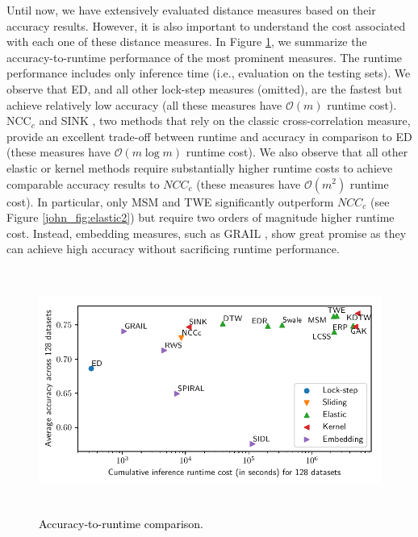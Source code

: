 \documentclass[11pt]{article}
\begin{document}
Until now, we have extensively evaluated distance measures based on their accuracy results. However, it is also important to understand the cost associated with each one of these distance measures. In Figure \ref{john_fig:accuracyruntime}, we summarize the accuracy-to-runtime performance of the most prominent measures. The runtime performance includes only inference time (i.e., evaluation on the testing sets). We observe that ED, and all other lock-step measures (omitted), are the fastest but achieve relatively low accuracy (all these measures have $\mathcal{O}(m)$ runtime cost). NCC$_c$ \cite{paparrizos2015k} and SINK \cite{paparrizos2019grail}, two methods that rely on the classic cross-correlation measure, provide an excellent trade-off between runtime and accuracy in comparison to ED (these measures have $\mathcal{O}(m \log m)$ runtime cost). We also observe that all other elastic or kernel methods require substantially higher runtime costs to achieve comparable accuracy results to $NCC_c$ (these measures have $\mathcal{O}(m^2)$ runtime cost). In particular, only MSM and TWE significantly outperform $NCC_c$ (see Figure \ref{john_fig:elastic2}) but require two orders of magnitude higher runtime cost. Instead, embedding measures, such as GRAIL \cite{paparrizos2019grail}, show great promise as they can achieve high accuracy without sacrificing runtime performance. %


\begin{figure}[t]
	\vspace*{-0.2cm}
	\centering
	\includegraphics[height=8cm,width=15cm]{submissions/John2023/runtime-dis-log.pdf}
	\vspace*{-0.3cm}
	\caption{\textcolor{black}{Accuracy-to-runtime comparison.}}%
	\label{john_fig:accuracyruntime}%
	\vspace*{-0.3cm}
\end{figure}
\end{document}
